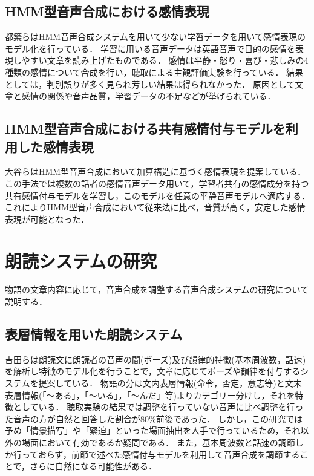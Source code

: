 \subsection{HMM型音声合成における感情表現}
都築ら\cite{tsuduki}はHMM音声合成システムを用いて少ない学習データを用いて感情表現のモデル化を行っている．
学習に用いる音声データは英語音声で目的の感情を表現しやすい文章を読み上げたものである．
感情は平静・怒り・喜び・悲しみの4種類の感情について合成を行い，聴取による主観評価実験を行っている．
結果としては，判別誤りが多く見られ芳しい結果は得られなかった．
原因として文章と感情の関係や音声品質，学習データの不足などが挙げられている．

\subsection{HMM型音声合成における共有感情付与モデルを利用した感情表現}
大谷\cite{otani}らはHMM型音声合成において加算構造に基づく感情表現を提案している．
この手法では複数の話者の感情音声データ用いて，学習者共有の感情成分を持つ共有感情付与モデルを学習し，このモデルを任意の平静音声モデルへ適応する．
これによりHMM型音声合成において従来法に比べ，音質が高く，安定した感情表現が可能となった．



\section{朗読システムの研究}
物語の文章内容に応じて，音声合成を調整する音声合成システムの研究について説明する．

\subsection{表層情報を用いた朗読システム}
吉田ら\cite{yoshida}は朗読文に朗読者の音声の間(ポーズ)及び韻律的特徴(基本周波数，話速)を解析し特徴のモデル化を行うことで，文章に応じてポーズや韻律を付与するシステムを提案している．
物語の分は文内表層情報(命令，否定，意志等)と文末表層情報(「〜ある」，「〜いる」，「〜んだ」等)よりカテゴリー分けし，それを特徴としている．
聴取実験の結果では調整を行っていない音声に比べ調整を行った音声の方が自然と回答した割合が80\%前後であった．
しかし，この研究では予め「情景描写」や「緊迫」といった場面抽出を人手で行っているため，それ以外の場面において有効であるか疑問である．
また，基本周波数と話速の調節しか行っておらず，前節で述べた感情付与モデルを利用して音声合成を調節することで，さらに自然になる可能性がある．

